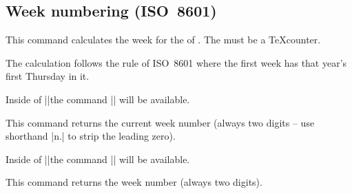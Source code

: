 \begin{multicols}{2}
\subsection{Week numbering (ISO~8601)}
\label{calendar:weeknumbering}
\begin{command}{\pgfcalendarjulianyeartoweek{}}
  This command calculates the week for the  of .
  The  must be a \TeX\space counter.

  The calculation follows the rule of ISO~8601 where the first week has that
  year's first Thursday in it.
\end{command}

Inside of |\pgfcalendar|\indexCommandO\pgfcalendar the command |\pgfcalendarcurrentweek| will be available.
\begin{command}{\pgfcalendarcurrentweek}
  This command returns the current week number (always two digits -- use shorthand |n.|
  to strip the leading zero).
\end{command}

Inside of |\ifdate|\indexCommandO\ifdate the command |\pgfcalendarifdateweek| will be available.
\begin{command}{\pgfcalendarifdateweek}
  This command returns the week number (always two digits).
\end{command}
\end{multicols}